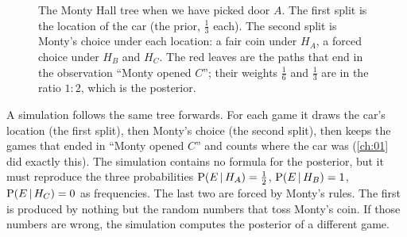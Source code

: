 \begin{figure}[htbp]
\centering
{}
\caption{The Monty Hall tree when we have picked door $A$. The first split is the
location of the car (the prior, $\tfrac13$ each). The second split is Monty's
choice under each location: a fair coin under $H_A$, a forced choice under $H_B$
and $H_C$. The red leaves are the paths that end in the observation ``Monty opened
$C$''; their weights $\tfrac16$ and $\tfrac13$ are in the ratio $1:2$, which is the
posterior.}
\label{6a:fig:monty-tree}
\end{figure}

A simulation follows the same tree forwards. For each game it draws the car's
location (the first split), then Monty's choice (the second split), then keeps the
games that ended in ``Monty opened $C$'' and counts where the car was
(\cref{ch:01} did exactly this). The simulation contains no formula for the
posterior, but it must reproduce the three probabilities
$\operatorname{P}(E\,\vert\, H_A)=\tfrac12$, $\operatorname{P}(E\,\vert\, H_B)=1$, $\operatorname{P}(E\,\vert\, H_C)=0$ as
frequencies. The last two are forced by Monty's rules. The first is produced by
nothing but the random numbers that toss Monty's coin. If those numbers are
wrong, the simulation computes the posterior of a different game.

